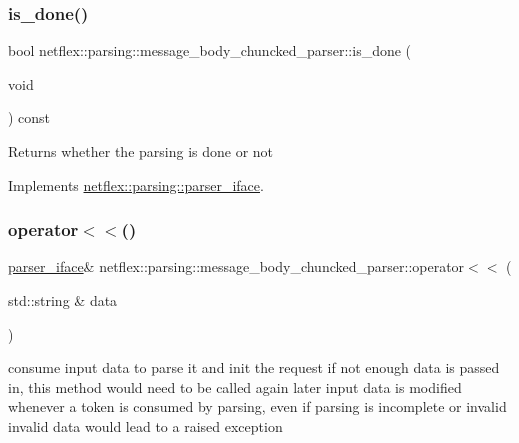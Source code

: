 \subsubsection{\texorpdfstring{is\+\_\+done()}{is\_done()}}
{\footnotesize\ttfamily bool netflex\+::parsing\+::message\+\_\+body\+\_\+chuncked\+\_\+parser\+::is\+\_\+done (\begin{DoxyParamCaption}\item[{void}]{ }\end{DoxyParamCaption}) const\hspace{0.3cm}{\ttfamily [virtual]}}

\begin{DoxyReturn}{Returns}
whether the parsing is done or not 
\end{DoxyReturn}


Implements \hyperlink{classnetflex_1_1parsing_1_1parser__iface_afebd1cc50d5958f712dfac0c023fd162}{netflex\+::parsing\+::parser\+\_\+iface}.

\mbox{\label{classnetflex_1_1parsing_1_1message__body__chuncked__parser_a18d0ab86d63bb22fb40663d06fcb12e1}} 
\subsubsection{\texorpdfstring{operator$<$$<$()}{operator<<()}}
{\footnotesize\ttfamily \hyperlink{classnetflex_1_1parsing_1_1parser__iface}{parser\+\_\+iface}\& netflex\+::parsing\+::message\+\_\+body\+\_\+chuncked\+\_\+parser\+::operator$<$$<$ (\begin{DoxyParamCaption}\item[{std\+::string \&}]{data }\end{DoxyParamCaption})\hspace{0.3cm}{\ttfamily [virtual]}}

consume input data to parse it and init the request if not enough data is passed in, this method would need to be called again later input data is modified whenever a token is consumed by parsing, even if parsing is incomplete or invalid invalid data would lead to a raised exception


